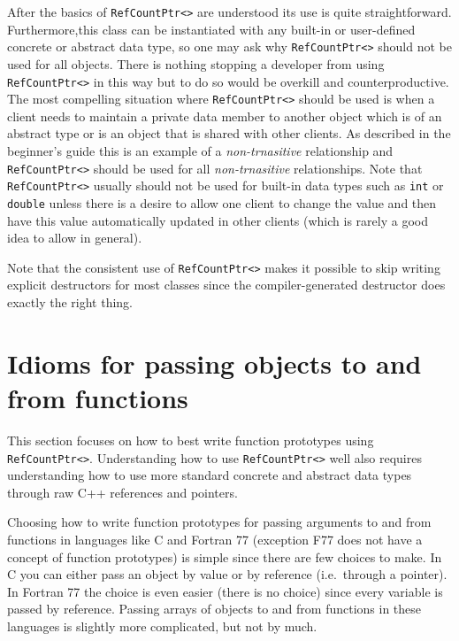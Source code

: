 After the basics of {}\texttt{Ref\-Count\-Ptr<>} are understood its
use is quite straightforward.  Furthermore,this class can be
instantiated with any built-in or user-defined concrete or abstract
data type, so one may ask why {}\texttt{Ref\-Count\-Ptr<>} should not
be used for all objects.  There is nothing stopping a developer from
using {}\texttt{Ref\-Count\-Ptr<>} in this way but to do so would be
overkill and counterproductive. The most compelling situation where
{}\texttt{Ref\-Count\-Ptr<>} should be used is when a client needs to
maintain a private data member to another object which is of an
abstract type or is an object that is shared with other clients.  As
described in the beginner's guide
{}\cite{ref:RefCountPtrBeginnersGuide} this is an example of a
{}\textit{non-trnasitive} relationship and
{}\texttt{Ref\-Count\-Ptr<>} should be used for all
{}\textit{non-trnasitive} relationships.  Note that
{}\texttt{Ref\-Count\-Ptr<>} usually should not be used for built-in
data types such as {}\texttt{int} or {}\texttt{double} unless there is
a desire to allow one client to change the value and then have this
value automatically updated in other clients (which is rarely a good
idea to allow in general).

Note that the consistent use of {}\texttt{Ref\-Count\-Ptr<>} makes it
possible to skip writing explicit destructors for most classes since
the compiler-generated destructor does exactly the right thing.

%
\section{Idioms for passing objects to and from functions}
\label{rcp:sec:passing-args}
%

This section focuses on how to best write function prototypes using
{}\texttt{Ref\-Count\-Ptr<>}.  Understanding how to use
{}\texttt{Ref\-Count\-Ptr<>} well also requires understanding how to
use more standard concrete and abstract data types through raw C++
references and pointers.

Choosing how to write function prototypes for passing arguments to and
from functions in languages like C and Fortran 77 (exception F77 does
not have a concept of function prototypes) is simple since there are
few choices to make.  In C you can either pass an object by value or
by reference (i.e.~through a pointer).  In Fortran 77 the choice is
even easier (there is no choice) since every variable is passed by
reference.  Passing arrays of objects to and from functions in these
languages is slightly more complicated, but not by much.

